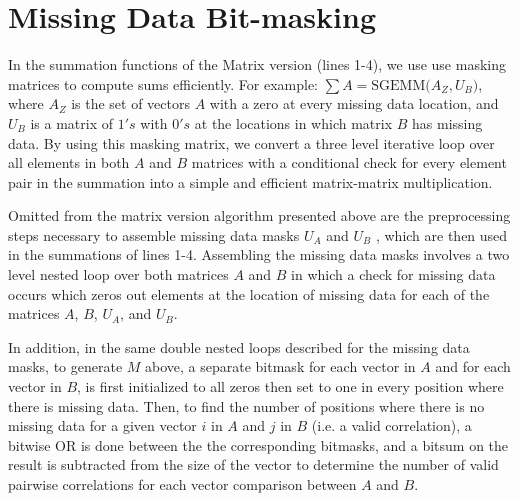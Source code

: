 \documentclass{bioinfo}
\begin{document}
\section{Missing Data Bit-masking} \label{MDBM}
In the summation functions of the Matrix version (lines 1-4), we use use masking matrices to compute 
sums efficiently. For example: $\sum A=\text{SGEMM(}A_Z,U_B\text{)}$, where $A_Z$ is the set of 
vectors $A$ with a zero at every missing data location, and $U_B$ is a matrix of $1's$ with $0's$ 
at the locations in which matrix $B$ has missing data. By using this masking matrix, we convert a 
three level iterative loop over all elements in both $A$ and $B$ matrices with a conditional check 
for every element pair in the summation into a simple and efficient matrix-matrix multiplication.

Omitted from the matrix version algorithm presented above are the preprocessing steps necessary to 
assemble missing data masks $U_A$ and $U_B$ , which are then used in the summations of lines 1-4.
Assembling the missing data masks involves a two level nested loop over both matrices $A$ and $B$ in 
which a check for missing data occurs which zeros out elements at the location of missing data for 
each of the matrices $A$, $B$, $U_A$, and $U_B$.

In addition, in the same double nested loops described for the missing data masks, to 
generate $M$ above, a separate bitmask for each vector in $A$ and for each vector in $B$, 
is first initialized to all zeros then set to one in every position where there is missing data.
Then, to find the number of positions where there is no missing data for a given vector $i$ 
in $A$ and $j$ in $B$ (i.e. a valid correlation), a bitwise OR is done between the the corresponding bitmasks, 
and a bitsum on the result is subtracted from the size of the vector to determine the number of valid
pairwise correlations for each vector comparison between $A$ and $B$. 
\end{document}

